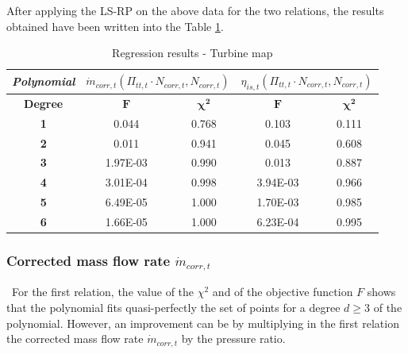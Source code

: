 After applying the LS-RP on the above data for the two relations, the results obtained have been written into the Table \ref{tab:reg_turbmap1}. 
\begin{longtable}[c]{@{}ccc|cc@{}}
\caption{Regression results - Turbine map}
\label{tab:reg_turbmap1}\\
\toprule
\textit{\textbf{Polynomial}} & \multicolumn{2}{c|}{$\dot{m}_{corr,t}(\Pi_{tt,t}\cdot N_{corr,t},N_{corr,t})$} & \multicolumn{2}{c}{$\eta_{is,t}(\Pi_{tt,t}\cdot N_{corr,t},N_{corr,t})$} \\* \midrule
\endfirsthead
%
\endhead
%
\bottomrule
\endfoot
%
\endlastfoot
%
\textbf{Degree}              & \multicolumn{1}{c}{$\mathbf{F}$}                  & \multicolumn{1}{c|}{$\mathbf{\chi^2}$}                 & \multicolumn{1}{c}{$\mathbf{F}$}               & \multicolumn{1}{c}{$\mathbf{\chi^2}$}               \\
\textbf{1}                   & 0.044                       & 0.768                             & 0.103                    & 0.111                           \\
\textbf{2}                   & 0.011                       & 0.941                             & 0.045                    & 0.608                           \\
\textbf{3}                   & 1.97E-03                    & 0.990                             & 0.013                    & 0.887                           \\
\textbf{4}                   & 3.01E-04                    & 0.998                             & 3.94E-03                 & 0.966                           \\
\textbf{5}                   & 6.49E-05                    & 1.000                             & 1.70E-03                 & 0.985                           \\
\textbf{6}                   & 1.66E-05                    & 1.000                             & 6.23E-04                 & 0.995                           \\* \bottomrule
\end{longtable}

\subsubsection{Corrected mass flow rate $\dot{m}_{corr,t}$}
\quad\ For the first relation, the value of the $\chi^2$ and of the objective function $F$ shows that the polynomial fits quasi-perfectly the set of points for a degree $d \geq 3$ of the polynomial. However, an improvement can be by multiplying in the first relation the corrected mass flow rate $\dot{m}_{corr,t}$ by the pressure ratio.


